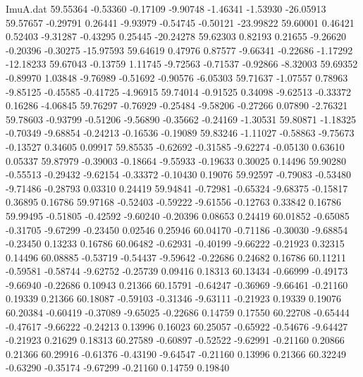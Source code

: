 \begin{filecontents}{ImuA.dat}
  59.55364   -0.53360   -0.17109   -9.90748   -1.46341   -1.53930  -26.05913
  59.57657   -0.29791    0.26441   -9.93979   -0.54745   -0.50121  -23.99822
  59.60001    0.46421    0.52403   -9.31287   -0.43295    0.25445  -20.24278
  59.62303    0.82193    0.21655   -9.26620   -0.20396   -0.30275  -15.97593
  59.64619    0.47976    0.87577   -9.66341   -0.22686   -1.17292  -12.18233
  59.67043   -0.13759    1.11745   -9.72563   -0.71537   -0.92866   -8.32003
  59.69352   -0.89970    1.03848   -9.76989   -0.51692   -0.90576   -6.05303
  59.71637   -1.07557    0.78963   -9.85125   -0.45585   -0.41725   -4.96915
  59.74014   -0.91525    0.34098   -9.62513   -0.33372    0.16286   -4.06845
  59.76297   -0.76929   -0.25484   -9.58206   -0.27266    0.07890   -2.76321
  59.78603   -0.93799   -0.51206   -9.56890   -0.35662   -0.24169   -1.30531
  59.80871   -1.18325   -0.70349   -9.68854   -0.24213   -0.16536   -0.19089
  59.83246   -1.11027   -0.58863   -9.75673   -0.13527    0.34605    0.09917
  59.85535   -0.62692   -0.31585   -9.62274   -0.05130    0.63610    0.05337
  59.87979   -0.39003   -0.18664   -9.55933   -0.19633    0.30025    0.14496
  59.90280   -0.55513   -0.29432   -9.62154   -0.33372   -0.10430    0.19076
  59.92597   -0.79083   -0.53480   -9.71486   -0.28793    0.03310    0.24419
  59.94841   -0.72981   -0.65324   -9.68375   -0.15817    0.36895    0.16786
  59.97168   -0.52403   -0.59222   -9.61556   -0.12763    0.33842    0.16786
  59.99495   -0.51805   -0.42592   -9.60240   -0.20396    0.08653    0.24419
  60.01852   -0.65085   -0.31705   -9.67299   -0.23450    0.02546    0.25946
  60.04170   -0.71186   -0.30030   -9.68854   -0.23450    0.13233    0.16786
  60.06482   -0.62931   -0.40199   -9.66222   -0.21923    0.32315    0.14496
  60.08885   -0.53719   -0.54437   -9.59642   -0.22686    0.24682    0.16786
  60.11211   -0.59581   -0.58744   -9.62752   -0.25739    0.09416    0.18313
  60.13434   -0.66999   -0.49173   -9.66940   -0.22686    0.10943    0.21366
  60.15791   -0.64247   -0.36969   -9.66461   -0.21160    0.19339    0.21366
  60.18087   -0.59103   -0.31346   -9.63111   -0.21923    0.19339    0.19076
  60.20384   -0.60419   -0.37089   -9.65025   -0.22686    0.14759    0.17550
  60.22708   -0.65444   -0.47617   -9.66222   -0.24213    0.13996    0.16023
  60.25057   -0.65922   -0.54676   -9.64427   -0.21923    0.21629    0.18313
  60.27589   -0.60897   -0.52522   -9.62991   -0.21160    0.20866    0.21366
  60.29916   -0.61376   -0.43190   -9.64547   -0.21160    0.13996    0.21366
  60.32249   -0.63290   -0.35174   -9.67299   -0.21160    0.14759    0.19840

\end{filecontents}
